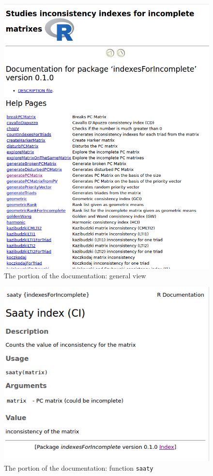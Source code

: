 \begin{figure}[!]
\centerline{\includegraphics[scale=0.58]{images/kod31.png}}
\caption{The portion of the documentation: general view}
\label{fig:rstudio}
\end{figure}

\begin{figure}[!]
\centerline{\includegraphics[scale=0.58]{images/kod32.png}}
\caption{The portion of the documentation: function \texttt{saaty}}
\label{fig:rstudio}
\end{figure}

